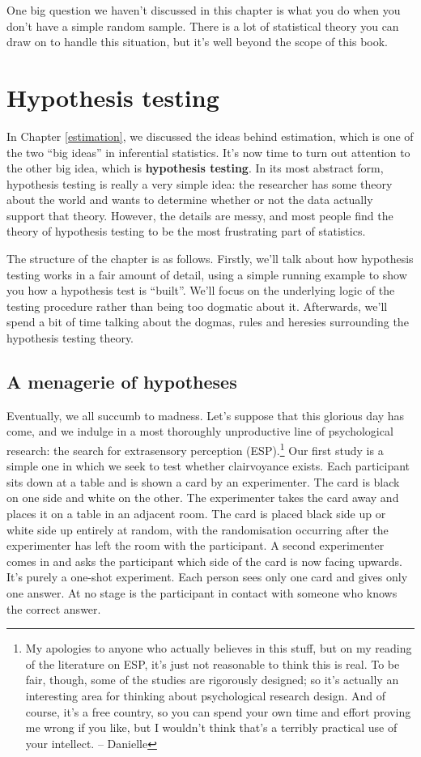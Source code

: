 \documentclass[
  11pt,
  a4paper,
  twoside,symmetric,openright]{book}
\theoremstyle{break}
\theoremstyle{break}
\begin{document}
One big question we haven't discussed in this chapter is what you do when you don't have a simple random sample. There is a lot of statistical theory you can draw on to handle this situation, but it's well beyond the scope of this book.

\chapter{Hypothesis testing}\label{hypothesistesting}

In Chapter \ref{estimation}, we discussed the ideas behind estimation, which is one of the two ``big ideas'' in inferential statistics. It's now time to turn out attention to the other big idea, which is \textbf{hypothesis testing}. In its most abstract form, hypothesis testing is really a very simple idea: the researcher has some theory about the world and wants to determine whether or not the data actually support that theory. However, the details are messy, and most people find the theory of hypothesis testing to be the most frustrating part of statistics.

The structure of the chapter is as follows. Firstly, we'll talk about how hypothesis testing works in a fair amount of detail, using a simple running example to show you how a hypothesis test is ``built''. We'll focus on the underlying logic of the testing procedure rather than being too dogmatic about it. Afterwards, we'll spend a bit of time talking about the dogmas, rules and heresies surrounding the hypothesis testing theory.

\section{A menagerie of hypotheses}\label{hypotheses}

Eventually, we all succumb to madness. Let's suppose that this glorious day has come, and we indulge in a most thoroughly unproductive line of psychological research: the search for extrasensory perception (ESP).\footnote{My apologies to anyone who actually believes in this stuff, but on my reading of the literature on ESP, it's just not reasonable to think this is real. To be fair, though, some of the studies are rigorously designed; so it's actually an interesting area for thinking about psychological research design. And of course, it's a free country, so you can spend your own time and effort proving me wrong if you like, but I wouldn't think that's a terribly practical use of your intellect. -- Danielle} Our first study is a simple one in which we seek to test whether clairvoyance exists. Each participant sits down at a table and is shown a card by an experimenter. The card is black on one side and white on the other. The experimenter takes the card away and places it on a table in an adjacent room. The card is placed black side up or white side up entirely at random, with the randomisation occurring after the experimenter has left the room with the participant. A second experimenter comes in and asks the participant which side of the card is now facing upwards. It's purely a one-shot experiment. Each person sees only one card and gives only one answer. At no stage is the participant in contact with someone who knows the correct answer.
\end{document}
